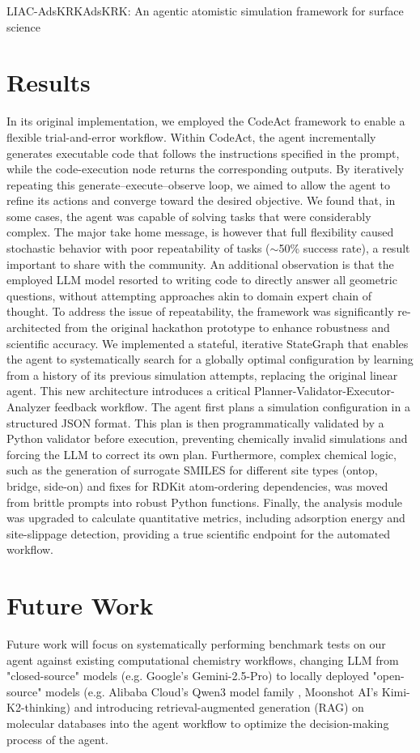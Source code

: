 \begin{teamsubmission}{LIAC-AdsKRK}{AdsKRK: An agentic atomistic simulation framework for surface science}
\section*{Results}
In its original implementation, we employed the CodeAct \cite{codeact2024} framework to enable a flexible trial-and-error workflow. Within CodeAct, the agent incrementally generates executable code that follows the instructions specified in the prompt, while the code-execution node returns the corresponding outputs. By iteratively repeating this generate–execute–observe loop, we aimed to allow the agent to refine its actions and converge toward the desired objective. We found that, in some cases, the agent was capable of solving tasks that were considerably complex. The major take home message, is however that full flexibility caused stochastic behavior with poor repeatability of tasks ($\sim$50\% success rate), a result important to share with the community. An additional observation is that the employed LLM model resorted to writing code to directly answer all geometric questions, without attempting approaches akin to domain expert chain of thought.
To address the issue of repeatability, the framework was significantly re-architected from the original hackathon prototype to enhance robustness and scientific accuracy. We implemented a stateful, iterative StateGraph that enables the agent to systematically search for a globally optimal configuration by learning from a history of its previous simulation attempts, replacing the original linear agent. This new architecture introduces a critical Planner-Validator-Executor-Analyzer feedback workflow. The agent first plans a simulation configuration in a structured JSON format. This plan is then programmatically validated by a Python validator before execution, preventing chemically invalid simulations and forcing the LLM to correct its own plan. Furthermore, complex chemical logic, such as the generation of surrogate SMILES for different site types (ontop, bridge, side-on) and fixes for RDKit atom-ordering dependencies, was moved from brittle prompts into robust Python functions. Finally, the analysis module was upgraded to calculate quantitative metrics, including adsorption energy and site-slippage detection, providing a true scientific endpoint for the automated workflow.

\section*{Future Work}
Future work will focus on systematically performing benchmark tests on our agent against existing computational chemistry workflows, changing LLM from "closed-source" models (e.g. Google's Gemini-2.5-Pro) to locally deployed "open-source" models (e.g. Alibaba Cloud's Qwen3 model family \cite{yang2025qwen3}, Moonshot AI's Kimi-K2-thinking) and introducing retrieval-augmented generation (RAG) on molecular databases into the agent workflow to optimize the decision-making process of the agent.


\end{teamsubmission}
